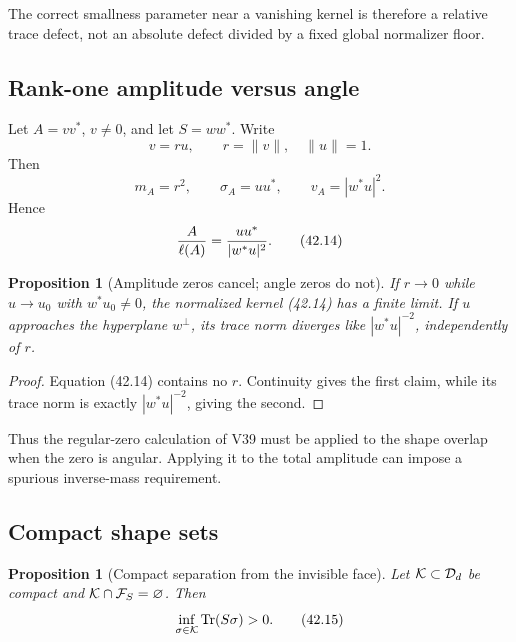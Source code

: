 \documentclass[11pt]{article}
\newtheorem{proposition}[theorem]{Proposition}
\theoremstyle{remark}
\begin{document}
The correct smallness parameter near a vanishing kernel is therefore
a relative trace defect, not an absolute defect divided by a fixed
global normalizer floor.

\subsection{Rank-one amplitude versus angle}

Let \(A=vv^*\), \(v\ne0\), and let \(S=ww^*\).  Write
\[
 v=r u,\qquad r=\|v\|,\quad\|u\|=1.
\]
Then
\begin{equation}
 m_A=r^2,\qquad
 \sigma_A=uu^*,\qquad
 v_A=|w^*u|^2.                                    \tag{42.13}
\end{equation}
Hence
\begin{equation}
 {A\over\ell(A)}
 =
 {uu^*\over|w^*u|^2}.                            \tag{42.14}
\end{equation}

\begin{proposition}[Amplitude zeros cancel; angle zeros do not]
\label{prop:v12v42-amplitude-angle}
If \(r\to0\) while \(u\to u_0\) with \(w^*u_0\ne0\), the normalized
kernel (42.14) has a finite limit.  If
\(u\) approaches the hyperplane \(w^\perp\), its trace norm diverges
like \(|w^*u|^{-2}\), independently of \(r\).
\end{proposition}

\begin{proof}
Equation (42.14) contains no \(r\).  Continuity gives the first
claim, while its trace norm is exactly \(|w^*u|^{-2}\), giving the
second.
\end{proof}

Thus the regular-zero calculation of V39 must be applied to the
shape overlap when the zero is angular.  Applying it to the total
amplitude can impose a spurious inverse-mass requirement.

\subsection{Compact shape sets}

\begin{proposition}[Compact separation from the invisible face]
\label{prop:v12v42-compact}
Let \({\cal K}\subset{\cal D}_d\) be compact and
\({\cal K}\cap{\cal F}_S=\varnothing\).  Then
\begin{equation}
 \inf_{\sigma\in{\cal K}}\operatorname{Tr}(S\sigma)>0.
                                                        \tag{42.15}
\end{equation}
\end{proposition}
\end{document}
